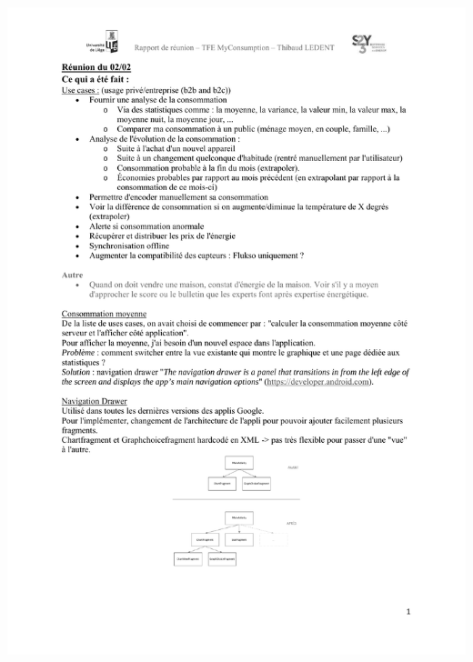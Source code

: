 \documentclass[a4paper, oneside, 11pt]{book}
\begin{document}
\includegraphics[width=1\textwidth]{reports_NB_Part8.pdf}
\newpage
\end{document}
